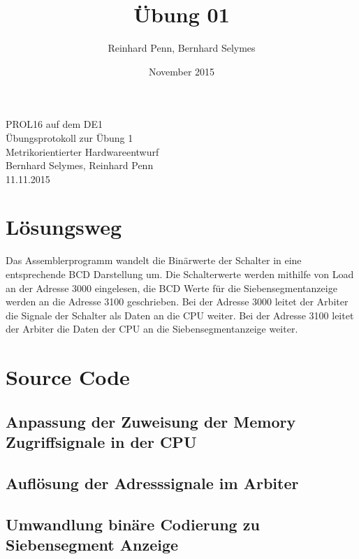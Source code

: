 \documentclass[12pt,a4paper]{article}
\begin{document}
\title{Übung 01}
\author{Reinhard Penn, Bernhard Selymes}
\date{November 2015}

\normalsize




\newcommand{\Uebung}{PROL16DE1}
\newcommand{\srcpath}{../../src}
\newcommand{\simpath}{../../sim}



\begin{center}
PROL16 auf dem DE1\\
Übungsprotokoll zur Übung 1\\
Metrikorientierter Hardwareentwurf\\
Bernhard Selymes, Reinhard Penn\\
11.11.2015
\end{center}


\section{Lösungsweg}
Das Assemblerprogramm wandelt die Binärwerte der Schalter in eine entsprechende BCD Darstellung um. Die Schalterwerte werden mithilfe von Load an der Adresse 3000 eingelesen, die BCD Werte für die Siebensegmentanzeige werden an die Adresse 3100 geschrieben.
Bei der Adresse 3000 leitet der Arbiter die Signale der Schalter als Daten an die CPU weiter. Bei der Adresse 3100 leitet der Arbiter die Daten der CPU an die Siebensegmentanzeige weiter.

\section{Source Code}
\subsection{Anpassung der Zuweisung der Memory Zugriffsignale in der CPU}


\subsection{Auflösung der Adresssignale im Arbiter}


\subsection{Umwandlung binäre Codierung zu Siebensegment Anzeige}

\end{document}
